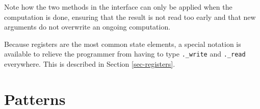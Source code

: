 \documentclass[twoside,letterpaper]{article}
\newcommand{\hm}{\hspace*{1em}}
\newcommand{\hmm}{\hspace*{2em}}
\newcommand{\te}[1]{\texttt{#1}}
\newcommand{\nterm}[1]{\emph{#1}}
\newcommand{\term}[1]{{\tt{#1}}}
\newcommand{\many}[1]{\{ #1 \}}
\newcommand{\gram}[2]{    \hm\makebox[10em][l]{\it #1}\makebox[1.5em][l]{::=}    #2}
\begin{document}
Note how the two methods in the interface can only be applied when
the computation is done, ensuring that the result is not read too early
and that new arguments do not overwrite an ongoing computation.

Because registers are the most common state elements, a special
notation is available to relieve the programmer from having to type
{\te{.\_write}} and {\te{.\_read}} everywhere.  This is described in Section
{\ref{sec-registers}}.

%

%
%



\section{Patterns}

\label{sec-patterns}
\end{document}
